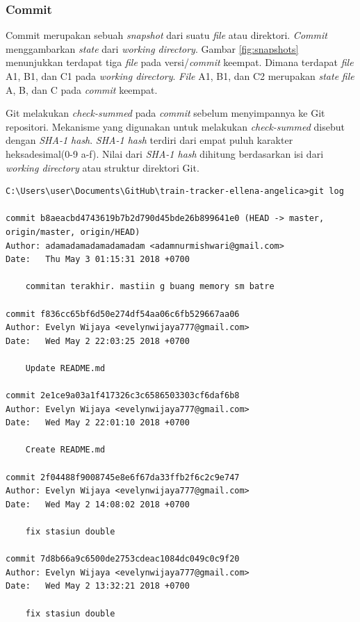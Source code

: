 \subsubsection{Commit}
Commit merupakan sebuah \textit{snapshot} dari suatu \textit{file} atau direktori. \textit{Commit} menggambarkan \textit{state} dari \textit{working directory}. Gambar \ref{fig:snapshots} menunjukkan terdapat tiga \textit{file} pada versi/\textit{commit} keempat. Dimana terdapat \textit{file} A1, B1, dan C1 pada \textit{working directory}. \textit{File} A1, B1, dan C2  merupakan \textit{state} \textit{file} A, B, dan C pada \textit{commit} keempat. 

Git melakukan \textit{check-summed} pada \textit{commit} sebelum menyimpannya ke Git repositori. Mekanisme yang digunakan untuk melakukan \textit{check-summed} disebut dengan \textit{SHA-1 hash}. \textit{SHA-1 hash} terdiri dari empat puluh karakter heksadesimal(0-9 a-f). Nilai dari \textit{SHA-1 hash} dihitung berdasarkan isi dari \textit{working directory} atau struktur direktori Git.


\begin{lstlisting}[caption={Contoh histori commit dalam pengembangan perangkat lunak},label={lst:git_histori},language=plaintext]
C:\Users\user\Documents\GitHub\train-tracker-ellena-angelica>git log

commit b8aeacbd4743619b7b2d790d45bde26b899641e0 (HEAD -> master, origin/master, origin/HEAD)
Author: adamadamadamadamadam <adamnurmishwari@gmail.com>
Date:   Thu May 3 01:15:31 2018 +0700

    commitan terakhir. mastiin g buang memory sm batre

commit f836cc65bf6d50e274df54aa06c6fb529667aa06
Author: Evelyn Wijaya <evelynwijaya777@gmail.com>
Date:   Wed May 2 22:03:25 2018 +0700

    Update README.md

commit 2e1ce9a03a1f417326c3c6586503303cf6daf6b8
Author: Evelyn Wijaya <evelynwijaya777@gmail.com>
Date:   Wed May 2 22:01:10 2018 +0700

    Create README.md

commit 2f04488f9008745e8e6f67da33ffb2f6c2c9e747
Author: Evelyn Wijaya <evelynwijaya777@gmail.com>
Date:   Wed May 2 14:08:02 2018 +0700

    fix stasiun double

commit 7d8b66a9c6500de2753cdeac1084dc049c0c9f20
Author: Evelyn Wijaya <evelynwijaya777@gmail.com>
Date:   Wed May 2 13:32:21 2018 +0700

    fix stasiun double
    
\end{lstlisting}

